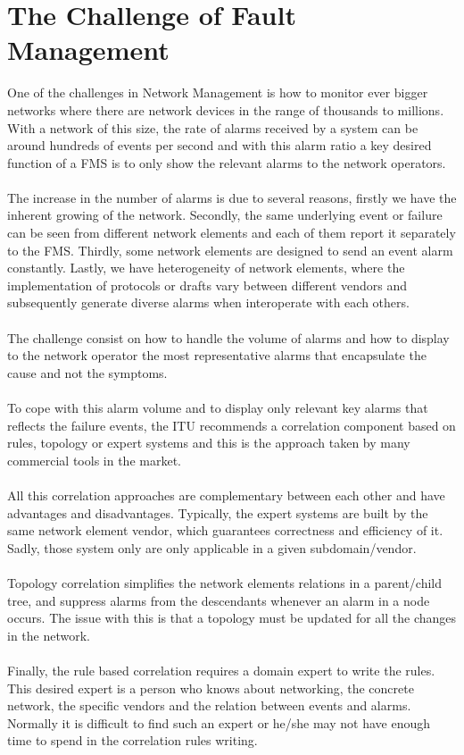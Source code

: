 \documentclass[10pt,a4paper]{article}
\begin{document}
 \section{The Challenge of Fault Management}
 One of the challenges in Network Management is how to monitor ever bigger networks where there are network devices in the range of thousands to millions. With a network of this size, the rate of alarms received by a system can be around hundreds of events per second and with this alarm ratio a key desired function of a FMS is to only show the relevant alarms to the network operators.
 \\\\
The increase in the number of alarms is due to several reasons, firstly we have the inherent growing of the network. Secondly, the same underlying event or failure can be seen from different network elements and each of them report it separately to the FMS. Thirdly, some network elements are designed to send an event alarm constantly. Lastly, we have heterogeneity of network elements, where the implementation of protocols or drafts vary between different vendors and subsequently generate diverse alarms when interoperate with each others\cite{ruleDiscoveringInNM}.
 \\\\
The challenge consist on how to handle the volume of alarms and how to display to the network operator the most representative alarms that encapsulate the cause and not the symptoms\cite{ruleDiscoveringInNM}.
 \\\\
To cope with this alarm volume and to display only relevant key alarms that reflects the failure events, the ITU recommends a correlation component based on rules, topology or expert systems and this is the approach taken by many commercial tools in the market. \cite{ITU3010}
 \\\\
All this correlation approaches are complementary between each other and have advantages and disadvantages. Typically, the expert systems are built by the same network element vendor, which guarantees correctness and efficiency of it. Sadly, those system only are only applicable in a given subdomain/vendor. 
\\\\
Topology correlation simplifies the network elements relations in a parent/child tree, and suppress alarms from the descendants whenever an alarm in a node occurs. The issue with this is that a topology must be updated for all the changes in the network.
\\\\
Finally, the rule based correlation requires a domain expert to write the rules. This desired expert is a person who knows about networking, the concrete network, the specific vendors and the relation between events and alarms. Normally it is difficult to find such an expert or he/she may not have enough time to spend in the correlation rules writing.
 
\end{document}
